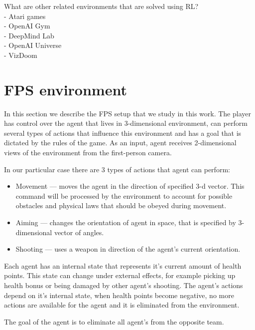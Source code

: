 
What are other related environments that are solved using RL? \\
- Atari games \\
- OpenAI Gym \\
- DeepMind Lab \\
- OpenAI Universe \\
- VizDoom \\

\section{FPS environment}
In this section we describe the FPS setup that we study in this work.
The player has control over the agent that lives in 3-dimensional environment, can perform several types of actions that influence this environment and has a goal that is dictated by the rules of the game.
As an input, agent receives 2-dimensional views of the environment from the first-person camera.

In our particular case there are 3 types of actions that agent can perform:
\begin{itemize}
    \item Movement --- moves the agent in the direction of specified 3-d vector. This command will be processed by the environment to account for possible obstacles and physical laws that should be obeyed during movement.
    \item Aiming --- changes the orientation of agent in space, that is specified by 3-dimensional vector of angles.
    \item Shooting --- uses a weapon in direction of the agent's current orientation.
\end{itemize}

Each agent has an internal state that represents it's current amount of health points. This state can change under external effects, for example picking up health bonus or being damaged by other agent's shooting.
The agent's actions depend on it's internal state, when health points become negative, no more actions are available for the agent and it is eliminated from the environment.

The goal of the agent is to eliminate all agent's from the opposite team.

